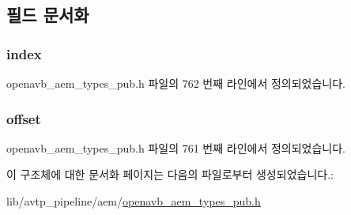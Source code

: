 \subsection{필드 문서화}
\subsubsection[{\texorpdfstring{index}{index}}]{ index}\hypertarget{structopenavb__aem__string__ref__t_a0078423694b8e1d8bbb34db246be30ed}{}\label{structopenavb__aem__string__ref__t_a0078423694b8e1d8bbb34db246be30ed}


openavb\+\_\+aem\+\_\+types\+\_\+pub.\+h 파일의 762 번째 라인에서 정의되었습니다.

\subsubsection[{\texorpdfstring{offset}{offset}}]{ offset}\hypertarget{structopenavb__aem__string__ref__t_a8a81b1e8e8c08716798408ae31c247df}{}\label{structopenavb__aem__string__ref__t_a8a81b1e8e8c08716798408ae31c247df}


openavb\+\_\+aem\+\_\+types\+\_\+pub.\+h 파일의 761 번째 라인에서 정의되었습니다.



이 구조체에 대한 문서화 페이지는 다음의 파일로부터 생성되었습니다.\+:\begin{DoxyCompactItemize}
\item 
lib/avtp\+\_\+pipeline/aem/\hyperlink{openavb__aem__types__pub_8h}{openavb\+\_\+aem\+\_\+types\+\_\+pub.\+h}\end{DoxyCompactItemize}
